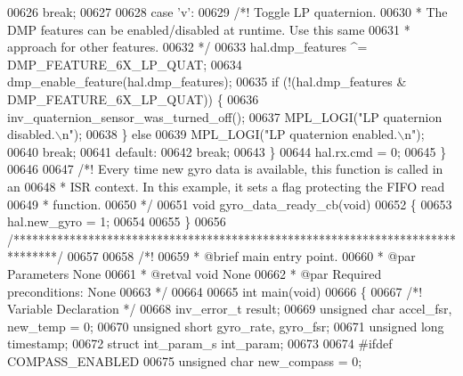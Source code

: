 \begin{DoxyCode}
{{{{{{{{00626         \textcolor{keywordflow}{break};
00627 
00628     \textcolor{keywordflow}{case} \textcolor{stringliteral}{'v'}:
00629         \textcolor{comment}{/*! Toggle LP quaternion.}
00630 \textcolor{comment}{         * The DMP features can be enabled/disabled at runtime. Use this same}
00631 \textcolor{comment}{         * approach for other features.}
00632 \textcolor{comment}{         */}
00633         hal.dmp\_features ^= DMP\_FEATURE\_6X\_LP\_QUAT;
00634         dmp\_enable\_feature(hal.dmp\_features);
00635         \textcolor{keywordflow}{if} (!(hal.dmp\_features & DMP\_FEATURE\_6X\_LP\_QUAT)) \{
00636             inv\_quaternion\_sensor\_was\_turned\_off();
00637             MPL\_LOGI(\textcolor{stringliteral}{"LP quaternion disabled.\(\backslash\)n"});
00638         \} \textcolor{keywordflow}{else}
00639             MPL\_LOGI(\textcolor{stringliteral}{"LP quaternion enabled.\(\backslash\)n"});
00640         \textcolor{keywordflow}{break};
00641     \textcolor{keywordflow}{default}:
00642         \textcolor{keywordflow}{break};
00643     \}
00644     hal.rx.cmd = 0;
00645 \}
00646 
00647 \textcolor{comment}{/*! Every time new gyro data is available, this function is called in an}
00648 \textcolor{comment}{ * ISR context. In this example, it sets a flag protecting the FIFO read}
00649 \textcolor{comment}{ * function.}
00650 \textcolor{comment}{ */}
00651 \textcolor{keywordtype}{void} gyro_data_ready_cb(\textcolor{keywordtype}{void})
00652 \{
00653     hal.new_gyro = 1;
00654 
00655 \}
00656 \textcolor{comment}{/*******************************************************************************/}
00657 
00658 \textcolor{comment}{/*!}
00659 \textcolor{comment}{  * @brief main entry point.}
00660 \textcolor{comment}{  * @par Parameters None}
00661 \textcolor{comment}{  * @retval void None}
00662 \textcolor{comment}{  * @par Required preconditions: None}
00663 \textcolor{comment}{  */}
00664 
00665 \textcolor{keywordtype}{int} main(\textcolor{keywordtype}{void})
00666 \{
00667     \textcolor{comment}{/*! Variable Declaration */}
00668     inv\_error\_t result;
00669     \textcolor{keywordtype}{unsigned} \textcolor{keywordtype}{char} accel\_fsr,  new\_temp = 0;
00670     \textcolor{keywordtype}{unsigned} \textcolor{keywordtype}{short} gyro\_rate, gyro\_fsr;
00671     \textcolor{keywordtype}{unsigned} \textcolor{keywordtype}{long} timestamp;
00672     \textcolor{keyword}{struct} int\_param\_s int\_param;
00673 
00674 \textcolor{preprocessor}{#}\textcolor{preprocessor}{ifdef} \textcolor{preprocessor}{COMPASS\_ENABLED}
00675     \textcolor{keywordtype}{unsigned} \textcolor{keywordtype}{char} new\_compass = 0;
}}}}}}}}
\end{DoxyCode}
